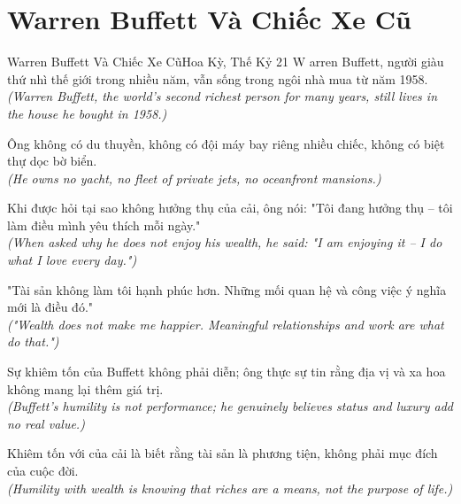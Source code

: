 \section{Warren Buffett Và Chiếc Xe Cũ}
\begin{truyen}{Warren Buffett Và Chiếc Xe Cũ}{Hoa Kỳ, Thế Kỷ 21}
W arren Buffett, người giàu thứ nhì thế giới trong nhiều năm, vẫn sống trong ngôi nhà mua từ năm 1958.\\
\textit{(Warren Buffett, the world's second richest person for many years, still lives in the house he bought in 1958.)}

Ông không có du thuyền, không có đội máy bay riêng nhiều chiếc, không có biệt thự dọc bờ biển.\\
\textit{(He owns no yacht, no fleet of private jets, no oceanfront mansions.)}

Khi được hỏi tại sao không hưởng thụ của cải, ông nói: "Tôi đang hưởng thụ -- tôi làm điều mình yêu thích mỗi ngày."\\
\textit{(When asked why he does not enjoy his wealth, he said: "I am enjoying it -- I do what I love every day.")}

"Tài sản không làm tôi hạnh phúc hơn. Những mối quan hệ và công việc ý nghĩa mới là điều đó."\\
\textit{("Wealth does not make me happier. Meaningful relationships and work are what do that.")}

Sự khiêm tốn của Buffett không phải diễn; ông thực sự tin rằng địa vị và xa hoa không mang lại thêm giá trị.\\
\textit{(Buffett's humility is not performance; he genuinely believes status and luxury add no real value.)}

\end{truyen}
\begin{baihoc}
  Khiêm tốn với của cải là biết rằng tài sản là phương tiện, không phải mục đích của cuộc đời.\\
  \textit{(Humility with wealth is knowing that riches are a means, not the purpose of life.)}
\end{baihoc}

